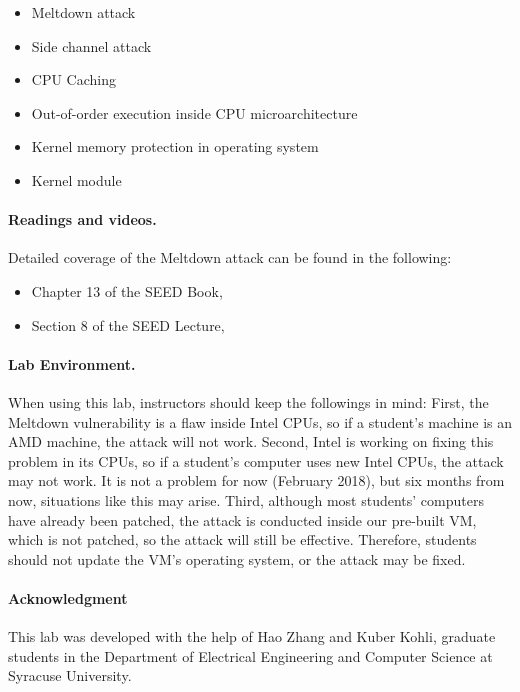 \begin{itemize}[noitemsep]
\item Meltdown attack 
\item Side channel attack 
\item CPU Caching
\item Out-of-order execution inside CPU microarchitecture
\item Kernel memory protection in operating system
\item Kernel module
\end{itemize} 


\paragraph{Readings and videos.}
Detailed coverage of the Meltdown attack can be found in the following:

\begin{itemize}
\item Chapter 13 of the SEED Book, \seedbook
\item Section 8 of the SEED Lecture, \seedcsvideo
\end{itemize}



\paragraph{Lab Environment.} \seedenvironment

When using this lab, instructors should keep the followings in mind: 
First, the Meltdown vulnerability
is a flaw inside Intel CPUs, so if a student's machine is an AMD machine,
the attack will not work. Second, Intel is working on fixing this
problem in its CPUs, so if a student's computer uses new Intel CPUs, the 
attack may not work. It is not a problem for now (February 2018),
but six months from now, situations like this may arise. 
Third, although most students'
computers have already been patched, the attack is conducted inside our
pre-built VM, which is not patched, so the attack will still be effective.
Therefore, students should not update the VM's operating system, 
or the attack may be fixed.


\paragraph{Acknowledgment} This lab was developed with the help of 
Hao Zhang and Kuber Kohli, graduate students in the Department of
Electrical Engineering and Computer Science at Syracuse University.





